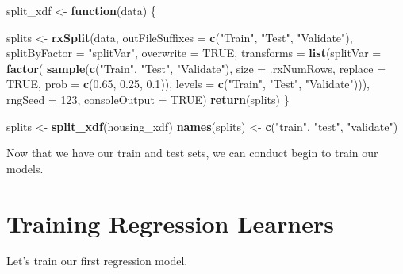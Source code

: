 \documentclass[]{book}
\newenvironment{Shaded}{\begin{snugshade}}{\end{snugshade}}
\newcommand{\KeywordTok}[1]{\textcolor[rgb]{0.13,0.29,0.53}{\textbf{#1}}}
\newcommand{\DataTypeTok}[1]{\textcolor[rgb]{0.13,0.29,0.53}{#1}}
\newcommand{\DecValTok}[1]{\textcolor[rgb]{0.00,0.00,0.81}{#1}}
\newcommand{\FloatTok}[1]{\textcolor[rgb]{0.00,0.00,0.81}{#1}}
\newcommand{\StringTok}[1]{\textcolor[rgb]{0.31,0.60,0.02}{#1}}
\newcommand{\OtherTok}[1]{\textcolor[rgb]{0.56,0.35,0.01}{#1}}
\newcommand{\ControlFlowTok}[1]{\textcolor[rgb]{0.13,0.29,0.53}{\textbf{#1}}}
\newcommand{\NormalTok}[1]{#1}
\theoremstyle{definition}
\theoremstyle{definition}
\theoremstyle{definition}
\theoremstyle{remark}
\begin{document}
\begin{Shaded}
\begin{Highlighting}[]
\NormalTok{split_xdf <-}\StringTok{ }\ControlFlowTok{function}\NormalTok{(data) \{}

\NormalTok{    splits <-}\StringTok{ }\KeywordTok{rxSplit}\NormalTok{(data,}
                      \DataTypeTok{outFileSuffixes =} \KeywordTok{c}\NormalTok{(}\StringTok{"Train"}\NormalTok{, }\StringTok{"Test"}\NormalTok{, }\StringTok{"Validate"}\NormalTok{),}
                         \DataTypeTok{splitByFactor =} \StringTok{"splitVar"}\NormalTok{,}
                         \DataTypeTok{overwrite =} \OtherTok{TRUE}\NormalTok{,}
                         \DataTypeTok{transforms =} \KeywordTok{list}\NormalTok{(}\DataTypeTok{splitVar =} \KeywordTok{factor}\NormalTok{(}
                           \KeywordTok{sample}\NormalTok{(}\KeywordTok{c}\NormalTok{(}\StringTok{"Train"}\NormalTok{, }\StringTok{"Test"}\NormalTok{, }\StringTok{"Validate"}\NormalTok{),}
                                  \DataTypeTok{size =}\NormalTok{ .rxNumRows,}
                                  \DataTypeTok{replace =} \OtherTok{TRUE}\NormalTok{,}
                                  \DataTypeTok{prob =} \KeywordTok{c}\NormalTok{(}\FloatTok{0.65}\NormalTok{, }\FloatTok{0.25}\NormalTok{, }\FloatTok{0.1}\NormalTok{)),}
                           \DataTypeTok{levels =} \KeywordTok{c}\NormalTok{(}\StringTok{"Train"}\NormalTok{, }\StringTok{"Test"}\NormalTok{, }\StringTok{"Validate"}\NormalTok{))),}
                         \DataTypeTok{rngSeed =} \DecValTok{123}\NormalTok{,}
                         \DataTypeTok{consoleOutput =} \OtherTok{TRUE}\NormalTok{)}
  \KeywordTok{return}\NormalTok{(splits)}
\NormalTok{\}}


\NormalTok{splits <-}\StringTok{ }\KeywordTok{split_xdf}\NormalTok{(housing_xdf)}
\KeywordTok{names}\NormalTok{(splits) <-}\StringTok{ }\KeywordTok{c}\NormalTok{(}\StringTok{"train"}\NormalTok{, }\StringTok{"test"}\NormalTok{, }\StringTok{"validate"}\NormalTok{)}
\end{Highlighting}
\end{Shaded}

Now that we have our train and test sets, we can conduct begin to train
our models.

\section{Training Regression
Learners}\label{training-regression-learners}

Let's train our first regression model.
\end{document}
